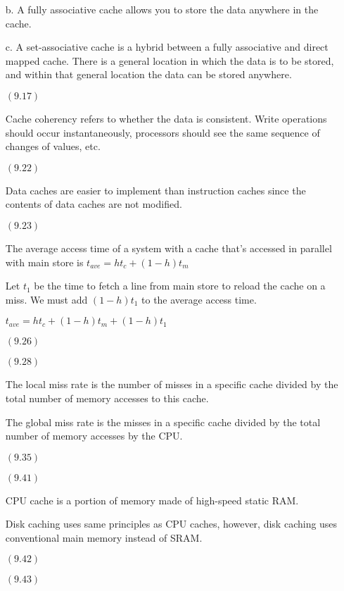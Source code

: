 \documentclass[letterpaper,10pt,titlepage]{article}
\begin{document}
\begin{enumerate}
  b.  A fully associative cache allows you to store the data anywhere in the cache.

  c.  A set-associative cache is a hybrid between a fully associative and direct mapped cache.  There is a general location in which the data is to be stored, and within that general location the data can be stored anywhere.
  
\item[$(9.17)$]

  Cache coherency refers to whether the data is consistent.  Write operations should occur instantaneously, processors should see the same sequence of changes of values, etc.
  
\item[$(9.22)$]

  Data caches are easier to implement than instruction caches since the contents of data caches are not modified.

\item[$(9.23)$]

  The average access time of a system with a cache that's accessed in parallel with main store is $t_{ave} = ht_{c} + (1-h)t_{m}$
  
  Let $t_{1}$ be the time to fetch a line from main store to reload the cache on a miss.  We must add $(1-h)t_{1}$ to the average access time.
  
  $t_{ave} = ht_{c} + (1-h)t_{m} + (1-h)t_{1}$

\item[$(9.26)$]

\item[$(9.28)$]

  The local miss rate is the number of misses in a specific cache divided by the total number of memory accesses to this cache.
  
  The global miss rate is the misses in a specific cache divided by the total number of memory accesses by the CPU.

\item[$(9.35)$]

\item[$(9.41)$]

  CPU cache is a portion of memory made of high-speed static RAM.
  
  Disk caching uses same principles as CPU caches, however, disk caching uses conventional main memory instead of SRAM.

\item[$(9.42)$]

\item[$(9.43)$]


\end{enumerate}
\end{document}
